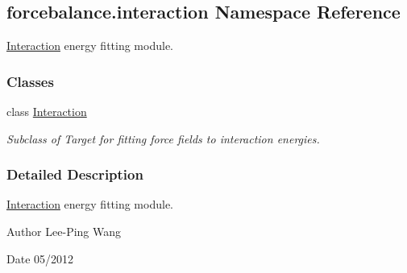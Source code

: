 \hypertarget{namespaceforcebalance_1_1interaction}{\subsection{forcebalance.\-interaction Namespace Reference}
\label{namespaceforcebalance_1_1interaction}
}


\hyperlink{classforcebalance_1_1interaction_1_1Interaction}{Interaction} energy fitting module.  


\subsubsection*{Classes}
\begin{DoxyCompactItemize}
\item 
class \hyperlink{classforcebalance_1_1interaction_1_1Interaction}{Interaction}
\begin{DoxyCompactList}\small\item\em Subclass of Target for fitting force fields to interaction energies. \end{DoxyCompactList}\end{DoxyCompactItemize}


\subsubsection{Detailed Description}
\hyperlink{classforcebalance_1_1interaction_1_1Interaction}{Interaction} energy fitting module. \begin{DoxyAuthor}{Author}
Lee-\/\-Ping Wang 
\end{DoxyAuthor}
\begin{DoxyDate}{Date}
05/2012 
\end{DoxyDate}
